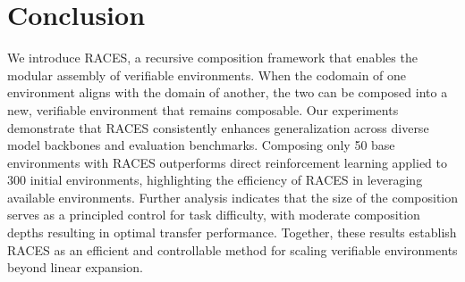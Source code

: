 \section{Conclusion}
\label{sec:conclusion}

We introduce RACES, a recursive composition framework that enables the modular assembly of verifiable environments. When the codomain of one environment aligns with the domain of another, the two can be composed into a new, verifiable environment that remains composable.
Our experiments demonstrate that RACES consistently enhances generalization across diverse model backbones and evaluation benchmarks.
Composing only 50 base environments with RACES outperforms direct reinforcement learning applied to 300 initial environments, highlighting the efficiency of RACES in leveraging available environments.
Further analysis indicates that the size of the composition serves as a principled control for task difficulty, with moderate composition depths resulting in optimal transfer performance.
Together, these results establish RACES as an efficient and controllable method for scaling verifiable environments beyond linear expansion.